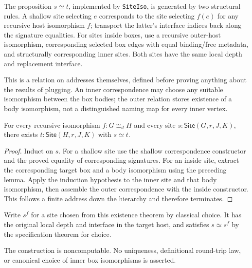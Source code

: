 \begin{definition}\label{term:site-correspondence}
The proposition $s\simeq t$, implemented by \texttt{SiteIso}, is generated by
two structural rules. A shallow site selecting $e$ corresponds to the site
selecting $f(e)$ for any recursive host isomorphism $f$; transport the latter's
interface indices back along the signature equalities. For sites inside boxes,
use a recursive outer-host isomorphism, corresponding selected box edges with
equal binding/free metadata, and structurally corresponding inner sites.
Both sites have the same local depth and replacement interface.
\end{definition}
This is a relation on addresses themselves, defined before proving anything
about the results of plugging. An inner correspondence may choose any suitable
isomorphism between the box bodies; the outer relation stores existence of a
body isomorphism, not a distinguished naming map for every inner vertex.

\begin{theorem}
For every recursive isomorphism $f:G\cong_d H$ and every site
$s:\mathsf{Site}(G,r,J,K)$, there exists
$t:\mathsf{Site}(H,r,J,K)$ with $s\simeq t$.
\end{theorem}
\begin{proof}
Induct on $s$. For a shallow site use the shallow correspondence constructor
and the proved equality of corresponding signatures. For an inside site,
extract the corresponding target box and a body isomorphism using the preceding
lemma. Apply the induction hypothesis to the inner site and that body
isomorphism, then assemble the outer correspondence with the inside constructor.
This follows a finite address down the hierarchy and therefore terminates.
\end{proof}

\begin{definition}\label{term:site-transport}
Write $s^f$ for a site chosen from this existence theorem by classical choice.
It has the original local depth and interface in the target host, and satisfies
$s\simeq s^f$ by the specification theorem for choice.
\end{definition}
The construction is noncomputable. No uniqueness, definitional round-trip law,
or canonical choice of inner box isomorphisms is asserted.

